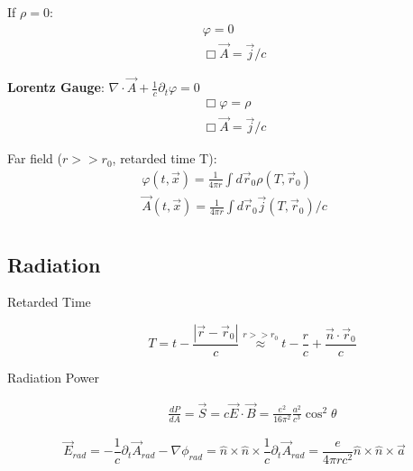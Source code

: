 \indent If $\rho = 0$:    
\begin{equation*}
    \begin{gathered}
	\varphi = 0 \\
	\Box\vec{A} = {\vec{j}}/{c}
    \end{gathered}
\end{equation*}

\textbf{Lorentz Gauge}:	$\nabla\cdot\vec{A} + \frac{1}{c}\partial_t\varphi = 0$
\begin{equation*}
    \begin{gathered}
	\Box\varphi = \rho	\\
	\Box\vec{A} = {\vec{j}}/{c}
    \end{gathered}
\end{equation*}

Far field ($r >> r_0$, retarded time T):
\begin{equation*}
    \begin{gathered}
	\varphi(t,\vec{x}) = \frac{1}{4\pi r}\int d\vec{r}_0\rho(T, \vec{r}_0)    \\
	\vec{A}(t, \vec{x}) = \frac{1}{4\pi r}\int d\vec{r}_0\vec{j}(T,\vec{r}_0)/c    \\
    \end{gathered}
\end{equation*}

\subsection{Radiation}
\begin{description}
    \item [Retarded Time] 
	\begin{equation}
	    \label{eqn:em::retardedTime}
	    T = t-\frac{|\vec{r} - \vec{r}_0|}{c} \stackrel{r>>r_0}{\approx} t - \frac{r}{c} + \frac{\vec{n}\cdot\vec{r}_0}{c}
	\end{equation}


    \item [Radiation Power]
	\begin{equation}
	    \label{eqn:em::radiationPower}
	    \begin{gathered}
		\frac{dP}{dA} = \vec{S} = c\vec{E}\cdot\vec{B} = \frac{e^2}{16\pi^2}\frac{a^2}{c^3}\cos^2{\theta}
	    \end{gathered}
	\end{equation}
\end{description}

\begin{equation}
    \vec{E}_{rad} = -\frac{1}{c}\partial_t\vec{A}_{rad} - \nabla\phi_{rad} = \hat{n}\times\hat{n}\times\frac{1}{c}\partial_t\vec{A}_{rad}
    = \frac{e}{4\pi r c^2}\hat{n}\times\hat{n}\times\vec{a}
\end{equation}

